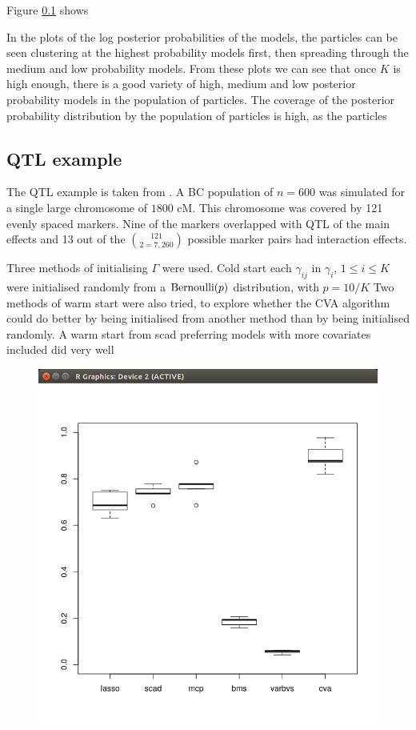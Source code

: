 \documentclass{amsart}[12pt]
\begin{document}
Figure \ref{} shows 

In the plots of the log posterior probabilities of the models, the particles can be seen clustering at the
highest probability models first, then spreading through the medium and low probability models. From these
plots we can see that once $K$ is high enough, there is a good variety of high, medium and low posterior
probability models in the population of particles. The coverage of the posterior probability distribution
by the population of particles is high, as the particles 

\subsection{QTL example}
The QTL example is taken from \cite{Xu2007}. A BC population of $n=600$ was simulated for a single large
chromosome of $1800$ cM. This chromosome was covered by 121 evenly spaced markers. Nine of the markers
overlapped with QTL of the main effects and 13 out of the $121 \choose{2} = 7,260$ possible marker pairs had
interaction effects.

Three methods of initialising $\Gamma$ were used.
Cold start each $\gamma_{ij}$ in $\gamma_i$, $1 \leq i \leq K$ were initialised randomly from a
$\text{Bernoulli} (p)$ distribution, with $p = 10 / K$
Two methods of warm start were also tried, to explore whether the CVA algorithm could do better by being
initialised from another method than by being initialised randomly. 
A warm start from scad preferring models with more covariates included did very well
\begin{figure}
\includegraphics{QLT_warm_start_covariates.png}
\end{figure}
\end{document}
